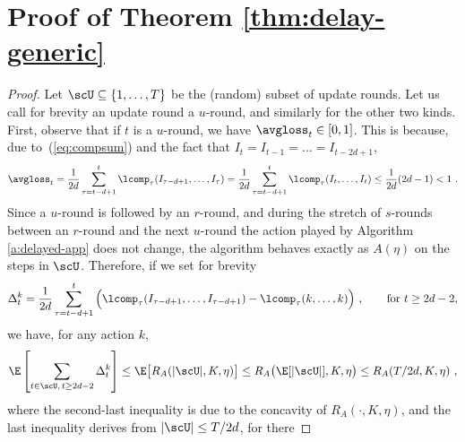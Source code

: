 





\section{Proof of Theorem \ref{thm:delay-generic}}

\begin{proof}
Let $\scU \subseteq \{1, \ldots, T\}$ be the (random) subset of update
rounds. Let us call for brevity an update round a $u$-round, and
similarly for the other two kinds. First, observe that if $t$ is a $u$-round, 
we have $\avgloss_t \in [0,1]$. This is because, due to~(\ref{eq:compsum}) and the fact that $I_t = I_{t-1} = \ldots = I_{t-2d+1}$,
%
\begin{align*}
	\avgloss_t 
=
	\frac{1}{2d}\sum_{\tau=t-d+1}^t \lcomp_\tau(I_{\tau-d+1},\dots,I_{\tau})
=
	\frac{1}{2d}\sum_{\tau=t-d+1}^t \lcomp_\tau(I_{t},\dots,I_{t})
\le
   \frac{1}{2d}(2d-1) < 1~.
\end{align*}
%
%
Since a $u$-round is followed by an $r$-round, and during the stretch of $s$-rounds between an $r$-round 
and the next $u$-round the action played by Algorithm \ref{a:delayed-app} does not change, the algorithm
behaves exactly as $A(\eta)$ on the steps in $\scU$. Therefore, if we set for brevity
\[
\Delta_t^k = \frac{1}{2d}\sum_{\tau=t-d+1}^t \Big(\lcomp_\tau(I_{\tau-d+1},\dots,I_{\tau-d+1}) - \lcomp_\tau(k,\dots,k)\Big)~,
\qquad\text{for $t \geq 2d-2$},
\]
we have, for any action $k$,
%
\begin{equation}
\label{e:upperupdate}
	\E\left[\sum_{t \in \scU,\, t\geq 2d-2} \Delta_t^k\right]
\le 
	\E\big[R_A(|\scU|,K,\eta)\big] 
\le
	R_A\big(\E[|\scU|],K,\eta\big)
\le
	R_A(T/2d,K,\eta)~,
\end{equation}
%
where the second-last inequality is due to the concavity of $R_A(\cdot, K,\eta)$, and
the last inequality derives from $|\scU| \leq T/2d$, for there

\end{proof}
